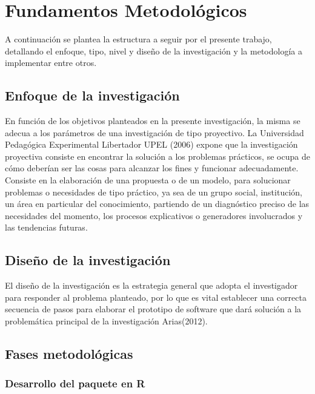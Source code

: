 \chapter{Fundamentos Metodol\'ogicos}

	A continuaci\'on se plantea la estructura a seguir por el presente trabajo, detallando el enfoque, tipo, nivel y dise\~no de la investigaci\'on y la metodolog\'ia a implementar entre otros.
	
\section{Enfoque de la investigaci\'on}
	
	En función de los objetivos planteados en la presente investigación, la misma se adecua a los parámetros de una investigación de tipo proyectivo. La Universidad Pedagógica Experimental Libertador UPEL (2006) expone que la investigación proyectiva consiste en encontrar la solución a los problemas prácticos, se ocupa de cómo deberían ser las cosas para alcanzar los fines y funcionar adecuadamente. Consiste en la elaboración de una propuesta o de un modelo, para solucionar problemas o necesidades de tipo práctico, ya sea de un grupo social, institución, un área en particular del conocimiento, partiendo de un diagnóstico preciso de las necesidades del momento, los procesos explicativos o generadores involucrados y las tendencias futuras.\\
	

	
\section{Dise\~no de la investigaci\'on}
	
El diseño de la investigación es la estrategia general que adopta el investigador para responder al problema planteado,  por lo que es vital establecer una correcta secuencia de pasos para elaborar el prototipo de software que dar\'a solución a la problem\'atica principal de la investigación Arias(2012).\\

\section{Fases metodológicas}

\subsection{Desarrollo del paquete en R}

